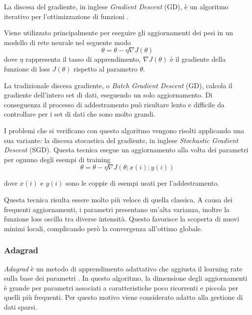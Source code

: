 La discesa del gradiente, in inglese \emph{Gradient Descent} (GD), è un algoritmo iterativo per l'ottimizzazione di funzioni \cite{ruder2016overview}.

Viene utilizzato principalmente per eseguire gli aggiornamenti dei pesi in un modello di rete neurale nel seguente modo
\begin{equation}
\theta = \theta - \eta \nabla J(\theta)
\end{equation}
dove $\eta$ rappresenta il tasso di apprendimento, $\nabla J(\theta)$ è il gradiente della funzione di loss $J(\theta)$ rispetto al parametro $\theta$. 

La tradizionale discesa gradiente, o \emph{Batch Gradient Descent} (GD), calcola il gradiente dell'intero set di dati, eseguendo un solo aggiornamento. Di conseguenza il processo di addestramento può risultare lento e difficile da controllare per i set di dati che sono molto grandi. 

I problemi che si verificano con questo algoritmo vengono risolti applicando una sua variante: la {discesa stocastica del gradiente}, in inglese \emph{Stochastic Gradient Descent} (SGD).
Questa tecnica esegue un aggiornamento alla volta dei parametri per ognuno degli esempi di training
\begin{equation}
\theta = \theta - \eta \nabla J(\theta; x(i); y(i))
\end{equation}

dove $x(i)$ e $y(i)$ sono le coppie di esempi usati per l'addestramento.

Questa tecnica risulta essere molto più veloce di quella classica. 
A causa dei frequenti aggiornamenti, i parametri presentano un'alta varianza, inoltre la funzione loss oscilla tra diverse intensità. Questo favorisce la scoperta di nuovi minimi locali, complicando però la convergenza all'ottimo globale. 


\subsubsection{Adagrad}
\label{subsubsec:adagrad}

\emph{Adagrad} è un metodo di apprendimento adattativo che aggiusta il learning rate sulla base dei parametri \cite{duchi2011adaptive} .
In questo algoritmo, la dimensione degli aggiornamenti è grande per parametri associati a caratteristiche poco ricorrenti e piccola per quelli più frequenti. Per questo motivo viene considerato adatto alla gestione di dati sparsi.

